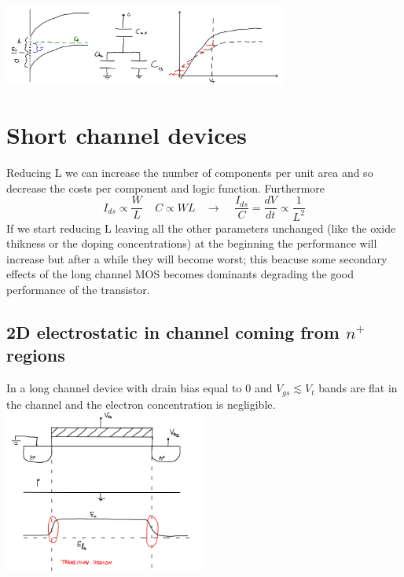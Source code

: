 \centering
\includegraphics[width=0.7\textwidth]{interfacest.png}\\
\raggedright


\section{Short channel devices}

Reducing L we can increase the number of components per unit area and so decrease the costs per component and logic function. Furthermore
\begin{equation}
I_{ds}\propto \frac{W}{L} \ \ \ \ \ C\propto WL \ \ \ \ \rightarrow \ \ \ \ \ \frac{I_{ds}}{C}=\frac{dV}{dt}\propto \frac{1}{L^2}
\end{equation}
If we start reducing L leaving all the other parameters unchanged (like the oxide thikness or the doping concentrations) at the beginning the performance will increase but after a while they will become worst; this beacuse some secondary effects of the long channel MOS becomes dominants degrading the good performance of the transistor.

\subsection{2D electrostatic in channel coming from $n^+$ regions}
In a long channel device with drain bias equal to 0 and $V_{gs} \lesssim V_t$ bands are flat in the channel and the electron concentration is negligible.\\

\centering
\includegraphics[width=0.5\textwidth]{longch.png}\\
\raggedright

